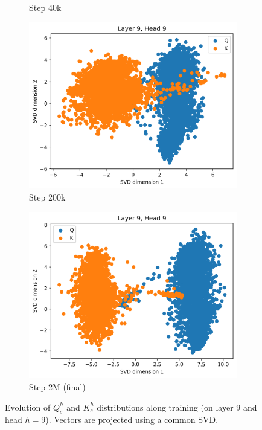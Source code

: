 \begin{figure}[ht]
\begin{subfigure}[b]{0.43\linewidth}
         \caption{Step 40k}
         \label{fig:dist_qk_s40}
    \end{subfigure}
    \begin{subfigure}[b]{0.43\linewidth}
         \includegraphics[width=\linewidth]{sources/part_1/anisotropy/imgs/dist_l9h9_s200.png}
         \caption{Step 200k}
         \label{fig:dist_qk_s200}
    \end{subfigure}
    \begin{subfigure}[b]{0.43\linewidth}
         \includegraphics[width=\linewidth]{sources/part_1/anisotropy/imgs/dist_l9h9_s2000.png}
         \caption{Step 2M (final)}
         \label{fig:dist_qk_s2M}
    \end{subfigure}
    \caption{Evolution of $Q^h_s$ and $K^h_s$ distributions along training (on layer $9$ and head $h=9$). Vectors are projected using a common SVD.}
    \label{fig:proj_qk_heads}
\end{figure}

